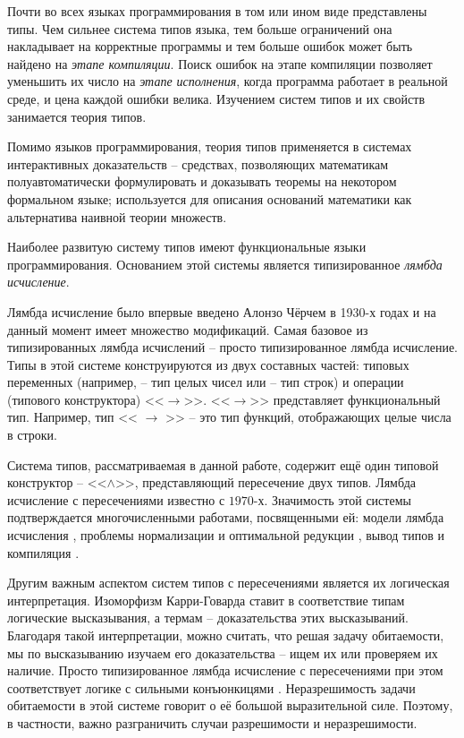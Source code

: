 \documentclass[../main.tex]{subfiles}
\begin{document}
 \label{sec:introduction}

Почти во всех языках программирования в том или ином виде представлены типы. Чем сильнее система типов языка, тем больше ограничений она накладывает на корректные программы и тем больше ошибок может быть найдено на {\it этапе компиляции}. Поиск ошибок на этапе компиляции позволяет уменьшить их число на {\it этапе исполнения}, когда программа работает в реальной среде, и цена каждой ошибки велика. Изучением систем типов и их свойств занимается теория типов. 

Помимо языков программирования, теория типов применяется в системах интерактивных доказательств -- средствах, позволяющих математикам полуавтоматически формулировать и доказывать теоремы на некотором формальном языке; используется для описания оснований математики как альтернатива наивной теории множеств.

\emptyline

Наиболее развитую систему типов имеют функциональные языки программирования. Основанием этой системы является типизированное {\it лямбда исчисление}.

Лямбда исчисление было впервые введено Алонзо Чёрчем в 1930-х годах и на данный момент имеет множество модификаций. Самая базовое из типизированных лямбда исчислений -- просто типизированное лямбда исчисление. Типы в этой системе конструируются из двух составных частей: типовых переменных (например,  -- тип целых чисел или  -- тип строк) и операции (типового конструктора) <<$\to$>>. <<$\to$>> представляет функциональный тип. Например, тип << $\to$ >> -- это тип функций, отображающих целые числа в строки. 

Система типов, рассматриваемая в данной работе, содержит ещё один типовой конструктор -- <<$\wedge$>>, представляющий пересечение двух типов. Лямбда исчисление с пересечениями известно с $1970$-х. Значимость этой системы подтверждается многочисленными работами, посвященными ей: модели лямбда исчисления \cite{alessi_2006, coppo_1980}, проблемы нормализации и оптимальной редукции \cite{neergaard_2004, pottinger_1980}, вывод типов и компиляция \cite{kfoury_2004, wells_2002}.

Другим важным аспектом систем типов с пересечениями является их логическая интерпретация. Изоморфизм Карри-Говарда ставит в соответствие типам логические высказывания, а термам -- доказательства этих высказываний. 
Благодаря такой интерпретации, можно считать, что решая задачу обитаемости, мы по высказыванию изучаем его доказательства -- ищем их или проверяем их наличие.
Просто типизированное лямбда исчисление с пересечениями при этом соответствует логике с сильными конъюнкицями . Неразрешимость задачи обитаемости в этой системе \cite{urzyczyn_1999} говорит о её большой выразительной силе. Поэтому, в частности, важно разграничить случаи разрешимости и неразрешимости. 
\end{document}
